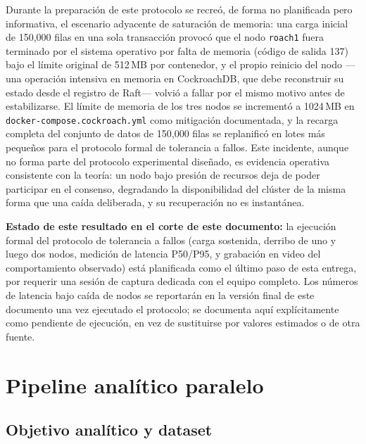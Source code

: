 \documentclass[11pt,letterpaper]{article}
\begin{document}
Durante la preparación de este protocolo se recreó, de forma no planificada pero informativa, el
escenario adyacente de saturación de memoria: una carga inicial de 150{,}000 filas en una sola
transacción provocó que el nodo \texttt{roach1} fuera terminado por el sistema operativo por falta
de memoria (código de salida 137) bajo el límite original de 512\,MB por contenedor, y el propio
reinicio del nodo —una operación intensiva en memoria en CockroachDB, que debe reconstruir su
estado desde el registro de Raft— volvió a fallar por el mismo motivo antes de estabilizarse. El
límite de memoria de los tres nodos se incrementó a 1024\,MB en
\texttt{docker-compose.cockroach.yml} como mitigación documentada, y la recarga completa del
conjunto de datos de 150{,}000 filas se replanificó en lotes más pequeños para el protocolo formal
de tolerancia a fallos. Este incidente, aunque no forma parte del protocolo experimental
diseñado, es evidencia operativa consistente con la teoría: un nodo bajo presión de recursos deja
de poder participar en el consenso, degradando la disponibilidad del clúster de la misma forma
que una caída deliberada, y su recuperación no es instantánea.

\textbf{Estado de este resultado en el corte de este documento:} la ejecución formal del protocolo
de tolerancia a fallos (carga sostenida, derribo de uno y luego dos nodos, medición de latencia
P50/P95, y grabación en video del comportamiento observado) está planificada como el último paso
de esta entrega, por requerir una sesión de captura dedicada con el equipo completo. Los números
de latencia bajo caída de nodos se reportarán en la versión final de este documento una vez
ejecutado el protocolo; se documenta aquí explícitamente como pendiente de ejecución, en vez de
sustituirse por valores estimados o de otra fuente.

\section{Pipeline analítico paralelo}
\label{sec:pipeline-paralelo}

\subsection{Objetivo analítico y dataset}
\end{document}
